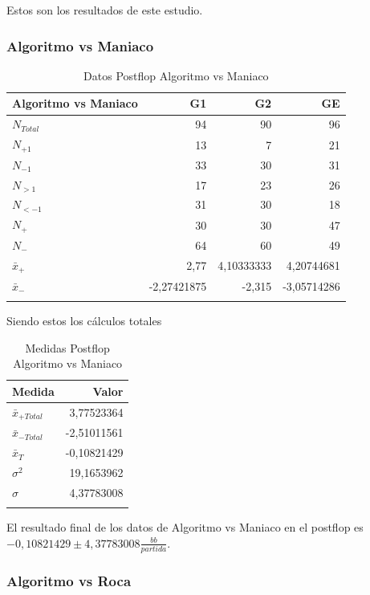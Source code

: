 Estos son los resultados de este estudio.

\subsubsection{Algoritmo vs Maniaco}

\begin{longtable}[c]{lrrr}
\hline 
Algoritmo vs Maniaco & G1 & G2 & GE \\ \hline
$N_{Total}$ & 94 & 90 & 96 \\
$N_{+1}$& 13 & 7 & 21 \\
$N_{-1}$ & 33 & 30 & 31 \\
$N_{>1}$& 17 & 23 & 26 \\
$N_{<-1}$& 31 & 30 & 18 \\  
$N_{+}$ & 30 & 30 & 47 \\
$N_{-}$& 64 & 60 & 49 \\\hline
$\bar{x}_+$ & 2,77 & 4,10333333 & 4,20744681 \\
$\bar{x}_-$& -2,27421875 & -2,315 & -3,05714286 \\ \hline
\caption{Datos Postflop Algoritmo vs Maniaco}
\label{tab:DPFAvM}
\end{longtable}

Siendo estos los cálculos totales

\begin{longtable}[c]{lr}
\hline 
Medida & Valor \\ \hline 
$\bar{x}_{+Total}$ & 3,77523364 \\
$\bar{x}_{-Total}$ & -2,51011561 \\
$\bar{x}_T$ & -0,10821429 \\
$\sigma^2$ & 19,1653962 \\
$\sigma$ & 4,37783008 \\  \hline
\caption{Medidas Postflop Algoritmo vs Maniaco}
\label{tab:MPFAvM}
\end{longtable}

El resultado final de los datos de Algoritmo vs Maniaco en el postflop es  $-0,10821429\pm4,37783008 $$\frac{bb}{partida}$.

\vspace{5mm} %

\subsubsection{Algoritmo vs Roca}

